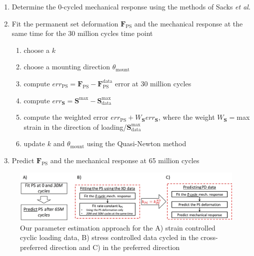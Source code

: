 \begin{enumerate}
\item Determine the 0-cycled mechanical response using the methods of Sacks \textit{et al}.\cite{sacks_novel_2016}
\item Fit the permanent set deformation $\mathbf{F}_\mathrm{PS}$ and the mechanical response at the same time for the 30 million cycles time point
	\begin{enumerate}
	\item choose a $k $
	\item choose a mounting direction $\theta_\mathrm{mount}$
	\item compute $err_\mathrm{PS} = \mathbf{F}_\mathrm{PS} - \mathbf{F}_\mathrm{PS}^\mathrm{data}$ error at 30 million cycles
	\item compute $err_\mathrm{\mathbf{S}} = \mathbf{S}^\mathrm{max} - \mathbf{S}_\mathrm{data}^\mathrm{max}$
	\item compute the weighted error $err_\mathrm{PS} + W_\mathbf{S} err_\mathbf{S}$, where the weight $W_\mathbf{S} = $max strain in the direction of loading/$\mathbf{S}_\mathrm{data}^\mathrm{max}$
	\item update $k $ and $\theta_\mathrm{mount}$ using the Quasi-Newton method \cite{king_dlib_2009}
	\end{enumerate}
\item Predict $\mathbf{F}_\mathrm{PS}$ and the mechanical response at 65 million cycles
\end{enumerate}


\begin{figure}[hbt]
\centering
\centerline{\includegraphics[width=\textwidth]{Images/chapter4/figure12}}
\caption{Our parameter estimation approach for the A) strain controlled cyclic loading data, B) stress controlled data cycled in the cross-preferred direction and C) in the preferred direction}
\label{fig:datamethods}
\end{figure}



